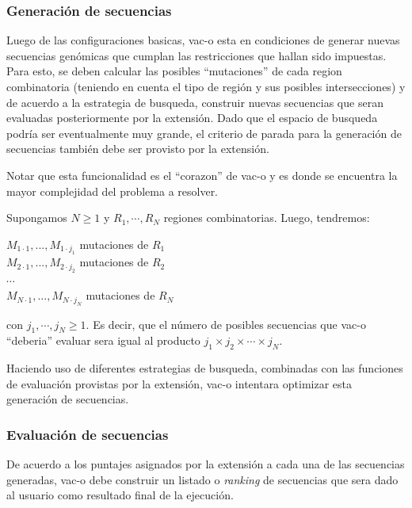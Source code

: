 \documentclass[10pt,a4paper]{article}
\begin{document}
  \subsubsection{Generaci\'on de secuencias}
  Luego de las configuraciones basicas, vac-o esta en condiciones de generar nuevas secuencias gen\'omicas que cumplan las restricciones que hallan sido impuestas. Para esto, se deben calcular las posibles ``mutaciones'' de cada region combinatoria (teniendo en cuenta el tipo de regi\'on y sus posibles intersecciones) y de acuerdo a la estrategia de busqueda, construir nuevas secuencias que seran evaluadas posteriormente por la extensi\'on. Dado que el espacio de busqueda podr\'ia ser eventualmente muy grande, el criterio de parada para la generaci\'on de secuencias tambi\'en debe ser provisto por la extensi\'on.

  Notar que esta funcionalidad es el ``corazon'' de vac-o y es donde se encuentra la mayor complejidad del problema a resolver. 

  Supongamos $N \geqslant 1$ y $R_{1}, \cdots, R_{N}$ regiones combinatorias. Luego, tendremos: \\
  \begin{center}    
    $M_{1\cdot1},..., M_{1\cdot j_{1}}$ mutaciones de $R_{1}$\\ 
    $M_{2\cdot1},..., M_{2\cdot j_{2}}$ mutaciones de $R_{2}$\\
    $\cdots$ \\
    $M_{N\cdot1},..., M_{N\cdot j_{N}}$ mutaciones de $R_{N}$   
  \end{center}
  con $j_{1}, \cdots, j_{N} \geqslant 1$. Es decir, que el n\'umero de posibles secuencias que vac-o ``deberia'' evaluar sera igual al producto $j_{1} \times j_{2} \times \cdots \times j_{N}$. 

  Haciendo uso de diferentes estrategias de busqueda, combinadas con las funciones de evaluaci\'on provistas por la extensi\'on, vac-o intentara optimizar esta generaci\'on de secuencias.

  \subsubsection{Evaluaci\'on de secuencias}
  De acuerdo a los puntajes asignados por la extensi\'on a cada una de las secuencias generadas, vac-o debe construir un listado o \textit{ranking} de secuencias que sera dado al usuario como resultado final de la ejecuci\'on.
\end{document}
